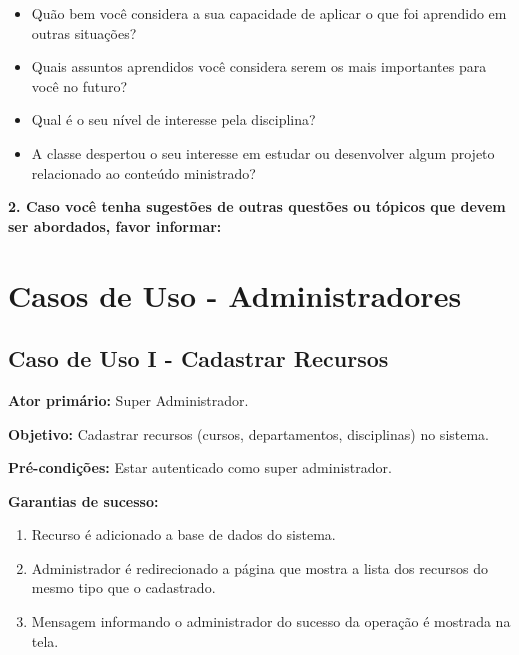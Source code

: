 \documentclass[
  12pt,       %
  openright,      %
  oneside,      %
  a4paper,      %
  english,      %
  french,        %
  spanish,     %
  brazil        %
  ]{abntex2-decsi}
\begin{document}
\begin{apendicesenv}
\begin{itemize}[label=\Square]
        \item Quão bem você considera a sua capacidade de aplicar o que foi aprendido em outras situações?
        \item Quais assuntos aprendidos você considera serem os mais importantes para você no futuro?
        \item Qual é o seu nível de interesse pela disciplina?
        \item A classe despertou o seu interesse em estudar ou desenvolver algum projeto relacionado ao conteúdo ministrado?
    \end{itemize}
  
  	\textbf{2. Caso você tenha sugestões de outras questões ou tópicos que devem ser abordados, favor informar:}
  

\chapter{Casos de Uso - Administradores}
	
   
    
    \section{Caso de Uso I - Cadastrar Recursos}
    
	\textbf{Ator primário:} Super Administrador.
				
    \textbf{Objetivo:} Cadastrar recursos (cursos, departamentos, disciplinas) no sistema.
    
	\textbf{Pré-condições:} Estar autenticado como super administrador.
		
	\textbf{Garantias de sucesso:} 
        
            \begin{enumerate}
            
            \item Recurso é adicionado a base de dados do sistema.  
            \item Administrador é redirecionado a página que mostra a lista dos recursos do mesmo tipo que o cadastrado.
            \item Mensagem informando o administrador do sucesso da operação é mostrada na tela.
            
            \end{enumerate}
        

\end{apendicesenv}
\end{document}
